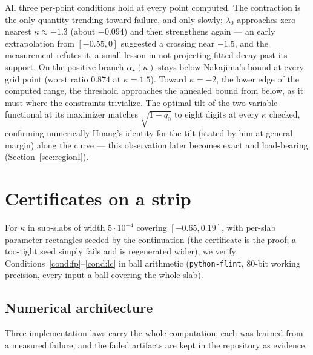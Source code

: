 \documentclass[11pt]{article}
\theoremstyle{remark}
\begin{document}
All three per-point conditions hold at every point computed.  The
contraction is the only quantity trending toward failure, and only
slowly; $\lambda_0$ approaches zero nearest $\kappa\approx-1.3$
(about $-0.094$) and then strengthens again --- an early extrapolation
from $[-0.55,0]$ suggested a crossing near $-1.5$, and the
measurement refutes it, a small lesson in not projecting fitted decay
past its support.  On the positive branch $\alpha_\star(\kappa)$
stays below Nakajima's bound at every grid point (worst ratio $0.874$
at $\kappa=1.5$).  Toward $\kappa=-2$, the lower edge of the computed range, the
threshold approaches the annealed bound from below, as it must where the constraints
trivialize.  The optimal tilt of the two-variable functional at its
maximizer matches $\sqrt{1-q_0}$ to eight digits at every $\kappa$
checked, confirming numerically Huang's identity for the tilt (stated
by him at general margin) along the curve --- this observation later
becomes exact and load-bearing (Section~\ref{sec:regionI}).

\section{Certificates on a strip}\label{sec:slabs}

For $\kappa$ in sub-slabs of width $5\cdot10^{-4}$ covering
$[-0.65,0.19]$, with per-slab parameter rectangles seeded by the
continuation (the certificate is the proof; a too-tight seed simply
fails and is regenerated wider), we verify
Conditions~\ref{cond:fp}--\ref{cond:lc} in ball arithmetic
(\texttt{python-flint}, 80-bit working precision, every input a ball
covering the whole slab).

\subsection{Numerical architecture}\label{sec:architecture}

Three implementation laws carry the whole computation; each was
learned from a measured failure, and the failed artifacts are kept in
the repository as evidence.
\end{document}
